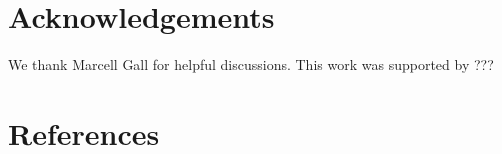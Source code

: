 \documentclass[12pt]{iopart}
\begin{document}
\section*{Acknowledgements}
We thank Marcell Gall for helpful discussions. This work was supported by ???

\section*{References}
{}

\end{document}
